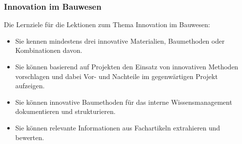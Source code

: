 \subsubsection*{Innovation im Bauwesen}
Die Lernziele für die Lektionen zum Thema Innovation im Bauwesen:
\begin{itemize}[noitemsep]
	\item Sie kennen mindestens drei innovative Materialien, Baumethoden oder Kombinationen davon.
	\item Sie können basierend auf Projekten den Einsatz von innovativen Methoden vorschlagen und dabei Vor- und Nachteile im gegenwärtigen Projekt aufzeigen.
	\item Sie können innovative Baumethoden für das interne Wissensmanagement dokumentieren und strukturieren.
	\item Sie können relevante Informationen aus Fachartikeln extrahieren und bewerten.
\end{itemize}
